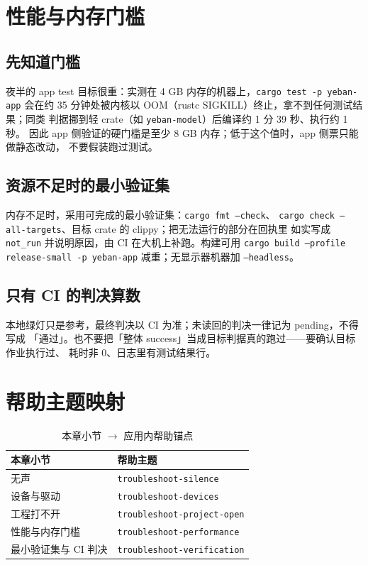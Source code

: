 \section{性能与内存门槛}

\subsection{先知道门槛}

夜半的 app test 目标很重：实测在 4 GB 内存的机器上，\texttt{cargo test -p yeban-app}
会在约 35 分钟处被内核以 OOM（rustc SIGKILL）终止，拿不到任何测试结果；同类
判据挪到轻 crate（如 \texttt{yeban-model}）后编译约 1 分 39 秒、执行约 1 秒。
因此 app 侧验证的硬门槛是至少 8 GB 内存；低于这个值时，app 侧票只能做静态改动，
不要假装跑过测试。

\subsection{资源不足时的最小验证集}

内存不足时，采用可完成的最小验证集：\texttt{cargo fmt --check}、
\texttt{cargo check --all-targets}、目标 crate 的 clippy；把无法运行的部分在回执里
如实写成 \texttt{not\_run} 并说明原因，由 CI 在大机上补跑。构建可用
\texttt{cargo build --profile release-small -p yeban-app} 减重；无显示器机器加
\texttt{--headless}。

\subsection{只有 CI 的判决算数}

本地绿灯只是参考，最终判决以 CI 为准；未读回的判决一律记为 pending，不得写成
「通过」。也不要把「整体 success」当成目标判据真的跑过——要确认目标作业执行过、
耗时非 0、日志里有测试结果行。

\section{帮助主题映射}

\begin{table}[htbp]
\centering
\caption{本章小节 $\to$ 应用内帮助锚点}
\label{tab:ch11-help}
\begin{tabular}{ll}
\hline
本章小节 & 帮助主题 \\
\hline
无声 & \texttt{troubleshoot-silence} \\
设备与驱动 & \texttt{troubleshoot-devices} \\
工程打不开 & \texttt{troubleshoot-project-open} \\
性能与内存门槛 & \texttt{troubleshoot-performance} \\
最小验证集与 CI 判决 & \texttt{troubleshoot-verification} \\
\hline
\end{tabular}
\end{table}

